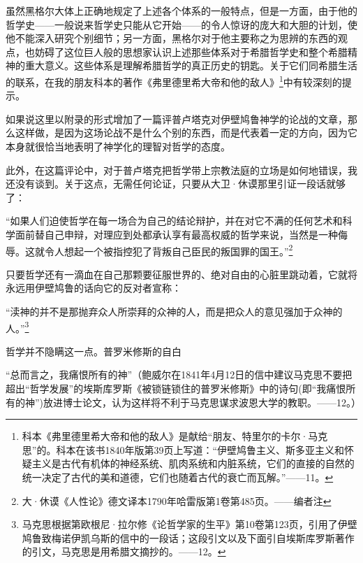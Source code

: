 \documentclass[a4paper,twoside,12pt]{ctexart}
\begin{document}
虽然黑格尔大体上正确地规定了上述各个体系的一般特点，但是一方面，由于他的哲学史——一般说来哲学史只能从它开始——的令人惊讶的庞大和大胆的计划，使他不能深入研究个别细节；另一方面，黑格尔对于他主要称之为思辨的东西的观点，也妨碍了这位巨人般的思想家认识上述那些体系对于希腊哲学史和整个希腊精神的重大意义。这些体系是理解希腊哲学的真正历史的钥匙。关于它们同希腊生活的联系，在我的朋友科本的著作《弗里德里希大帝和他的敌人》\footnote{科本《弗里德里希大帝和他的敌人》是献给“朋友、特里尔的卡尔·马克思”的。科本在该书1840年版第39页上写道：“伊壁鸠鲁主义、斯多亚主义和怀疑主义是古代有机体的神经系统、肌肉系统和内脏系统，它们的直接的自然的统一决定了古代的美和道德，它们也随着古代的衰亡而瓦解。”——11。}中有较深刻的提示。

如果说这里以附录的形式增加了一篇评普卢塔克对伊壁鸠鲁神学的论战的文章，那么这样做，是因为这场论战不是什么个别的东西，而是代表着一定的方向，因为它本身就很恰当地表明了神学化的理智对哲学的态度。

此外，在这篇评论中，对于普卢塔克把哲学带上宗教法庭的立场是如何地错误，我还没有谈到。关于这点，无需任何论证，只要从大卫·休谟那里引证一段话就够了：

\begin{fangsong}
    “如果人们迫使哲学在每一场合为自己的结论辩护，并在对它不满的任何艺术和科学面前替自己申辩，对理应到处都承认享有最高权威的哲学来说，当然是一种侮辱。这就令人想起一个被指控犯了背叛自己臣民的叛国罪的国王。”\footnote{大·休谟《人性论》德文译本1790年哈雷版第1卷第485页。——编者注}
\end{fangsong}

只要哲学还有一滴血在自己那颗要征服世界的、绝对自由的心脏里跳动着，它就将永远用伊壁鸠鲁的话向它的反对者宣称：

\begin{fangsong}
    “渎神的并不是那抛弃众人所崇拜的众神的人，而是把众人的意见强加于众神的人。”\footnote{马克思根据第欧根尼·拉尔修《论哲学家的生平》第10卷第123页，引用了伊壁鸠鲁致梅诺伊凯乌斯的信中的一段话；这段引文以及下面引自埃斯库罗斯著作的引文，马克思是用希腊文摘抄的。——12。}
\end{fangsong}

哲学并不隐瞒这一点。普罗米修斯的自白

\begin{fangsong}
    “总而言之，我痛恨所有的神”（鲍威尔在1841年4月12日的信中建议马克思不要把超出“哲学发展”的埃斯库罗斯《被锁链锁住的普罗米修斯》中的诗句(即“我痛恨所有的神”)放进博士论文，认为这样将不利于马克思谋求波恩大学的教职。——12。）
\end{fangsong}
\end{document}
